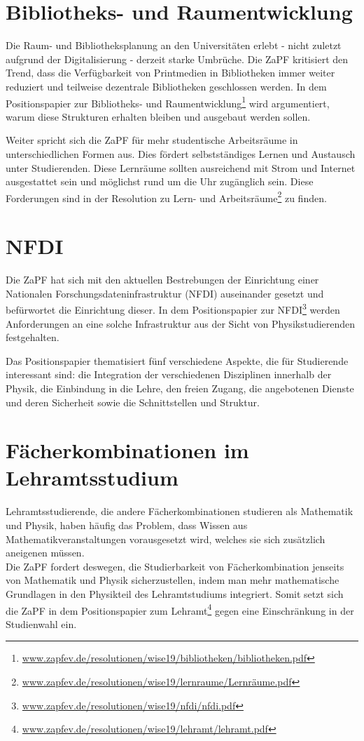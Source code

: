 \section*{Bibliotheks- und Raumentwicklung}
Die Raum- und Bibliotheksplanung an den Universitäten erlebt - nicht zuletzt aufgrund der Digitalisierung - derzeit starke Umbrüche. Die ZaPF kritisiert den Trend, dass die Verfügbarkeit von Printmedien in Bibliotheken immer weiter reduziert und teilweise dezentrale Bibliotheken geschlossen werden. In dem Positionspapier zur Bibliotheks- und Raumentwicklung\footnote{\href{https://zapfev.de/resolutionen/wise19/bibliotheken/bibliotheken.pdf}{www.zapfev.de/resolutionen/wise19/bibliotheken/bibliotheken.pdf}} wird argumentiert, warum diese Strukturen erhalten bleiben und ausgebaut werden sollen.

Weiter spricht sich die ZaPF für mehr studentische Arbeitsräume in unterschiedlichen Formen aus. Dies fördert selbstständiges Lernen und Austausch unter Studierenden. Diese Lernräume sollten ausreichend mit Strom und Internet ausgestattet sein und möglichst rund um die Uhr zugänglich sein. Diese Forderungen sind in der Resolution zu Lern- und Arbeitsräume\footnote{\href{https://zapfev.de/resolutionen/wise19/lernraume/Lernr\%C3\%A4ume.pdf}{www.zapfev.de/resolutionen/wise19/lernraume/Lernräume.pdf}} zu finden.

\section*{NFDI}
Die ZaPF hat sich mit den aktuellen Bestrebungen der Einrichtung einer Nationalen Forschungsdateninfrastruktur (NFDI) auseinander gesetzt und befürwortet die Einrichtung dieser. In dem Positionspapier zur NFDI\footnote{\href{https://zapfev.de/resolutionen/wise19/nfdi/nfdi.pdf}{www.zapfev.de/resolutionen/wise19/nfdi/nfdi.pdf}} werden Anforderungen an eine solche Infrastruktur aus der Sicht von Physikstudierenden festgehalten.

Das Positionspapier thematisiert fünf verschiedene Aspekte, die für Studierende interessant sind: die Integration der verschiedenen Disziplinen innerhalb der Physik, die Einbindung in die Lehre, den freien Zugang, die angebotenen Dienste und deren Sicherheit sowie die Schnittstellen und Struktur.

\newpage
\section*{Fächerkombinationen im Lehramtsstudium}
Lehramtsstudierende, die andere Fächerkombinationen studieren als Mathematik und Physik, haben häufig das Problem, dass Wissen aus Mathematikveranstaltungen vorausgesetzt wird, welches sie sich zusätzlich aneigenen müssen.\\
Die ZaPF fordert deswegen, die Studierbarkeit von Fächerkombination jenseits von Mathematik und Physik sicherzustellen, indem man mehr mathematische Grundlagen in den Physikteil des Lehramtstudiums integriert. Somit setzt sich die ZaPF in dem Positionspapier zum Lehramt\footnote{\href{https://zapfev.de/resolutionen/wise19/lehramt/lehramt.pdf}{www.zapfev.de/resolutionen/wise19/lehramt/lehramt.pdf}} gegen eine Einschränkung in der Studienwahl ein.

